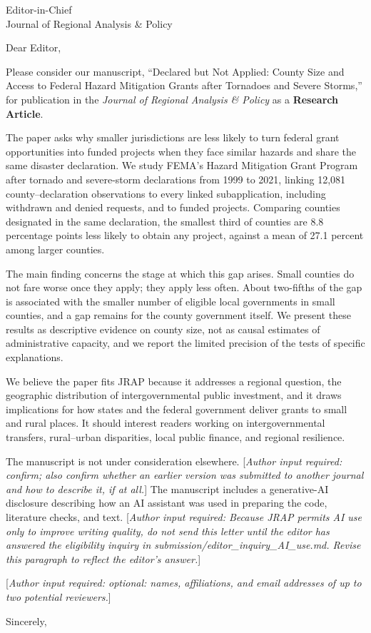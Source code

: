 \documentclass[11pt]{letter}
\date{\authorinput{date}}
\newcommand{\authorinput}[1]{\textcolor{red!70!black}{[\textit{Author input required: #1}]}}
\begin{document}
\begin{letter}{Editor-in-Chief\\Journal of Regional Analysis \& Policy}
\opening{Dear Editor,}

Please consider our manuscript, ``Declared but Not Applied: County Size and Access to Federal Hazard Mitigation Grants after Tornadoes and Severe Storms,'' for publication in the \textit{Journal of Regional Analysis \& Policy} as a \textbf{Research Article}.

The paper asks why smaller jurisdictions are less likely to turn federal grant opportunities into funded projects when they face similar hazards and share the same disaster declaration. We study FEMA's Hazard Mitigation Grant Program after tornado and severe-storm declarations from 1999 to 2021, linking 12,081 county--declaration observations to every linked subapplication, including withdrawn and denied requests, and to funded projects. Comparing counties designated in the same declaration, the smallest third of counties are 8.8 percentage points less likely to obtain any project, against a mean of 27.1 percent among larger counties.

The main finding concerns the stage at which this gap arises. Small counties do not fare worse once they apply; they apply less often. About two-fifths of the gap is associated with the smaller number of eligible local governments in small counties, and a gap remains for the county government itself. We present these results as descriptive evidence on county size, not as causal estimates of administrative capacity, and we report the limited precision of the tests of specific explanations.

We believe the paper fits JRAP because it addresses a regional question, the geographic distribution of intergovernmental public investment, and it draws implications for how states and the federal government deliver grants to small and rural places. It should interest readers working on intergovernmental transfers, rural--urban disparities, local public finance, and regional resilience.

The manuscript is not under consideration elsewhere. \authorinput{confirm; also confirm whether an earlier version was submitted to another journal and how to describe it, if at all.} The manuscript includes a generative-AI disclosure describing how an AI assistant was used in preparing the code, literature checks, and text. \authorinput{Because JRAP permits AI use only to improve writing quality, do not send this letter until the editor has answered the eligibility inquiry in submission/editor\_inquiry\_AI\_use.md. Revise this paragraph to reflect the editor's answer.}

\authorinput{optional: names, affiliations, and email addresses of up to two potential reviewers.}

\closing{Sincerely,}
\end{letter}
\end{document}
